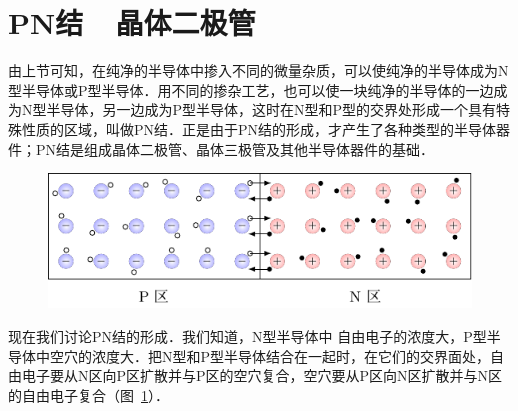 \section{PN结~~晶体二极管}
由上节可知，在纯净的半导体中掺入不同的微量杂质，可以使纯净的半导体成为N型半导体或P型半导体．用不同的掺杂工艺，也可以使一块纯净的半导体的一边成为N型半导体，另一边成为P型半导体，这时在N型和P型的交界处形成一个具有特殊性质的区域，叫做PN结．正是由于PN结的形成，才产生了各种类型的半导体器件；PN结是组成晶体二极管、晶体三极管及其他半导体器件的基础．
\begin{figure}[htbp]
    \centering
    \includegraphics{fig/B/8-22.pdf}
    \caption{}\label{fig_B_8-22}
\end{figure}

现在我们讨论PN结的形成．我们知道，N型半导体中
自由电子的浓度大，P型半导体中空穴的浓度大．把N型和P型半导体结合在一起时，在它们的交界面处，自由电子要从N区向P区扩散并与P区的空穴复合，空穴要从P区向N区扩散并与N区的自由电子复合（图~\ref{fig_B_8-22}）．

